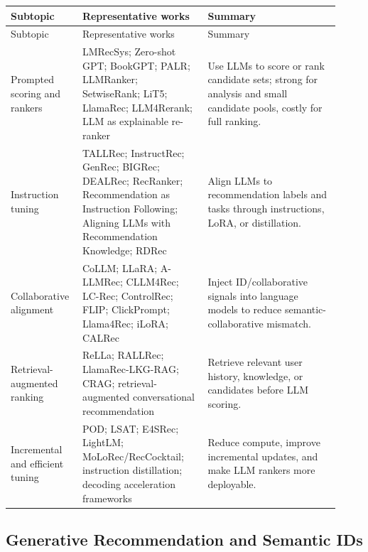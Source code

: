 \documentclass[11pt]{article}
\begin{document}
\small
\begin{longtable}{@{}p{0.18\linewidth}p{0.36\linewidth}p{0.38\linewidth}@{}}
\toprule
Subtopic & Representative works & Summary\\
\midrule
\endfirsthead
\toprule
Subtopic & Representative works & Summary\\
\midrule
\endhead
Prompted scoring and rankers & LMRecSys; Zero-shot GPT; BookGPT; PALR; LLMRanker; SetwiseRank; LiT5; LlamaRec; LLM4Rerank; LLM as explainable re-ranker & Use LLMs to score or rank candidate sets; strong for analysis and small candidate pools, costly for full ranking.\\
Instruction tuning & TALLRec; InstructRec; GenRec; BIGRec; DEALRec; RecRanker; Recommendation as Instruction Following; Aligning LLMs with Recommendation Knowledge; RDRec & Align LLMs to recommendation labels and tasks through instructions, LoRA, or distillation.\\
Collaborative alignment & CoLLM; LLaRA; A-LLMRec; CLLM4Rec; LC-Rec; ControlRec; FLIP; ClickPrompt; Llama4Rec; iLoRA; CALRec & Inject ID/collaborative signals into language models to reduce semantic-collaborative mismatch.\\
Retrieval-augmented ranking & ReLLa; RALLRec; LlamaRec-LKG-RAG; CRAG; retrieval-augmented conversational recommendation & Retrieve relevant user history, knowledge, or candidates before LLM scoring.\\
Incremental and efficient tuning & POD; LSAT; E4SRec; LightLM; MoLoRec/RecCocktail; instruction distillation; decoding acceleration frameworks & Reduce compute, improve incremental updates, and make LLM rankers more deployable.\\
\bottomrule
\end{longtable}
\normalsize

\subsection{Generative Recommendation and Semantic IDs}
\end{document}
